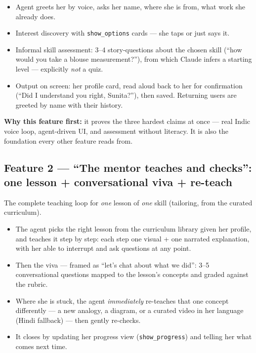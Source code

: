 \documentclass[11pt]{article}
\begin{document}
\begin{itemize}
  \item Agent greets her by voice, asks her name, where she is from, what work she already does.
  \item Interest discovery with \texttt{show\_options} cards --- she taps or just says it.
  \item Informal skill assessment: 3--4 story-questions about the chosen skill (``how would you take a blouse measurement?''), from which Claude infers a starting level --- explicitly \emph{not} a quiz.
  \item Output on screen: her profile card, read aloud back to her for confirmation (``Did I understand you right, Sunita?''), then saved. Returning users are greeted by name with their history.
\end{itemize}

\textbf{Why this feature first:} it proves the three hardest claims at once --- real Indic voice loop, agent-driven UI, and assessment without literacy. It is also the foundation every other feature reads from.

\subsection{Feature 2 --- ``The mentor teaches and checks'': one lesson + conversational viva + re-teach}

The complete teaching loop for \emph{one} lesson of \emph{one} skill (tailoring, from the curated curriculum).

\begin{itemize}
  \item The agent picks the right lesson from the curriculum library given her profile, and teaches it step by step: each step one visual + one narrated explanation, with her able to interrupt and ask questions at any point.
  \item Then the viva --- framed as ``let's chat about what we did'': 3--5 conversational questions mapped to the lesson's concepts and graded against the rubric.
  \item Where she is stuck, the agent \emph{immediately} re-teaches that one concept differently --- a new analogy, a diagram, or a curated video in her language (Hindi fallback) --- then gently re-checks.
  \item It closes by updating her progress view (\texttt{show\_progress}) and telling her what comes next time.
\end{itemize}
\end{document}
